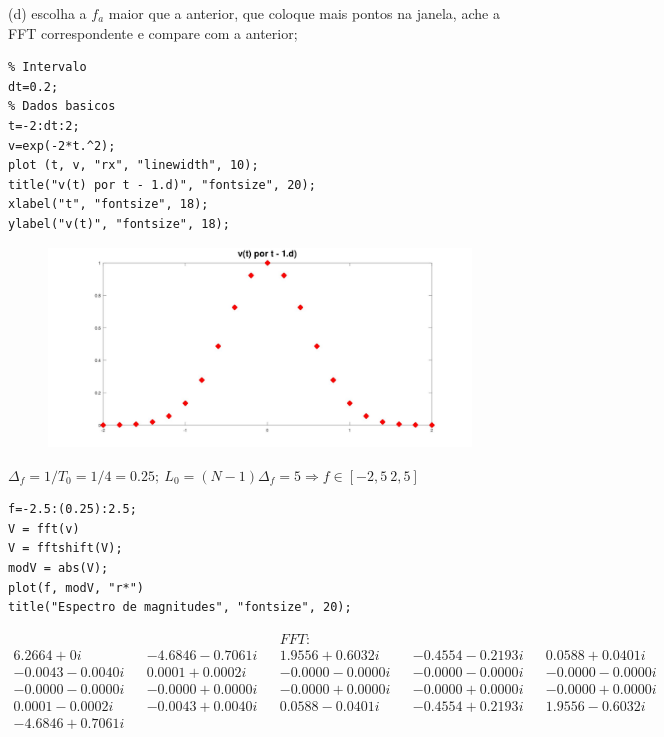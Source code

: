 \documentclass[10pt]{article}
\begin{document}
(d) escolha a $f_a$ maior que a anterior, que coloque mais pontos na janela, ache a FFT correspondente e compare com a anterior;

\begin{verbatim}
% Intervalo
dt=0.2;
% Dados basicos
t=-2:dt:2;
v=exp(-2*t.^2);
plot (t, v, "rx", "linewidth", 10);
title("v(t) por t - 1.d)", "fontsize", 20);
xlabel("t", "fontsize", 18);
ylabel("v(t)", "fontsize", 18);   
\end{verbatim}

\begin{figure}[h]
    \includegraphics[scale=0.2]{questao1d}
    \centering
\end{figure}

$\Delta_f = 1/T_0 = 1/4 = 0.25; \ L_0 = (N - 1)\Delta_f = 5 \Rightarrow f \in [-2,5 \ 2,5]$

\begin{verbatim}
f=-2.5:(0.25):2.5;
V = fft(v)
V = fftshift(V);
modV = abs(V);
plot(f, modV, "r*")
title("Espectro de magnitudes", "fontsize", 20); 
\end{verbatim}

\begin{align*}
    && && FFT: \\
    6.2664 +      0i && -4.6846 - 0.7061i &&  1.9556 + 0.6032i && -0.4554 - 0.2193i &&  0.0588 + 0.0401i \\
   -0.0043 - 0.0040i &&  0.0001 + 0.0002i && -0.0000 - 0.0000i && -0.0000 - 0.0000i && -0.0000 - 0.0000i \\
   -0.0000 - 0.0000i && -0.0000 + 0.0000i && -0.0000 + 0.0000i && -0.0000 + 0.0000i && -0.0000 + 0.0000i \\
    0.0001 - 0.0002i && -0.0043 + 0.0040i &&  0.0588 - 0.0401i && -0.4554 + 0.2193i && 1.9556 - 0.6032i \\
   -4.6846 + 0.7061i
\end{align*}
\end{document}
